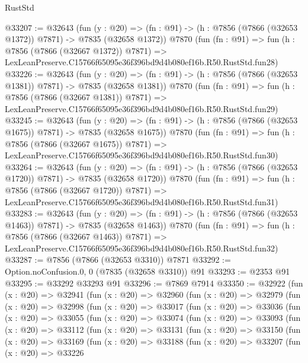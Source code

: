 \begin{lexlean}{RustStd}
\begin{coremodule}
@33207 := @32643
    (fun (y : @20) =>
    (fn : @91) -> (h : @7856 (@7866 (@32653 @1372)) @7871) -> @7835 (@32658 @1372))
    @7870
    (fun (fn : @91) =>
    fun (h : @7856 (@7866 (@32667 @1372)) @7871) =>
    LexLeanPreserve.C15766f65095e36f396bd9d4b080ef16b.R50.RustStd.fun28)
@33226 := @32643
    (fun (y : @20) =>
    (fn : @91) -> (h : @7856 (@7866 (@32653 @1381)) @7871) -> @7835 (@32658 @1381))
    @7870
    (fun (fn : @91) =>
    fun (h : @7856 (@7866 (@32667 @1381)) @7871) =>
    LexLeanPreserve.C15766f65095e36f396bd9d4b080ef16b.R50.RustStd.fun29)
@33245 := @32643
    (fun (y : @20) =>
    (fn : @91) -> (h : @7856 (@7866 (@32653 @1675)) @7871) -> @7835 (@32658 @1675))
    @7870
    (fun (fn : @91) =>
    fun (h : @7856 (@7866 (@32667 @1675)) @7871) =>
    LexLeanPreserve.C15766f65095e36f396bd9d4b080ef16b.R50.RustStd.fun30)
@33264 := @32643
    (fun (y : @20) =>
    (fn : @91) -> (h : @7856 (@7866 (@32653 @1720)) @7871) -> @7835 (@32658 @1720))
    @7870
    (fun (fn : @91) =>
    fun (h : @7856 (@7866 (@32667 @1720)) @7871) =>
    LexLeanPreserve.C15766f65095e36f396bd9d4b080ef16b.R50.RustStd.fun31)
@33283 := @32643
    (fun (y : @20) =>
    (fn : @91) -> (h : @7856 (@7866 (@32653 @1463)) @7871) -> @7835 (@32658 @1463))
    @7870
    (fun (fn : @91) =>
    fun (h : @7856 (@7866 (@32667 @1463)) @7871) =>
    LexLeanPreserve.C15766f65095e36f396bd9d4b080ef16b.R50.RustStd.fun32)
@33287 := @7856 (@7866 (@32653 @3310)) @7871
@33292 := Option.noConfusion.{0, 0} (@7835 (@32658 @3310)) @91
@33293 := @2353 @91
@33295 := @33292 @33293 @91
@33296 := @7869 @7914
@33350 := @32922
    (fun (x : @20) =>
    @32941
      (fun (x : @20) =>
      @32960
        (fun (x : @20) =>
        @32979
          (fun (x : @20) =>
          @32998
            (fun (x : @20) =>
            @33017
              (fun (x : @20) =>
              @33036
                (fun (x : @20) =>
                @33055
                  (fun (x : @20) =>
                  @33074
                    (fun (x : @20) =>
                    @33093
                      (fun (x : @20) =>
                      @33112
                        (fun (x : @20) =>
                        @33131
                          (fun (x : @20) =>
                          @33150
                            (fun (x : @20) =>
                            @33169
                              (fun (x : @20) =>
                              @33188
                                (fun (x : @20) =>
                                @33207
                                  (fun (x : @20) =>
                                  @33226

\end{coremodule}
\end{lexlean}
